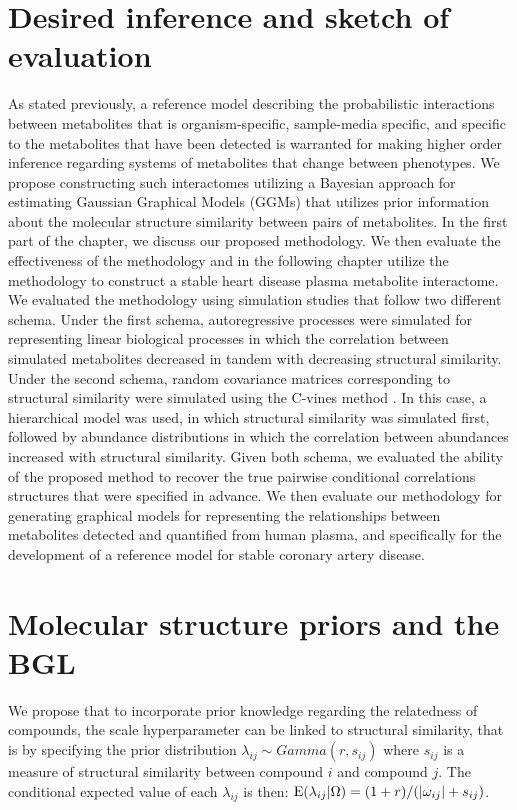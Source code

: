 \label{structureADBGL}
\begin{DoubleSpace*}
\section{Desired inference and sketch of evaluation}
As stated previously, a reference model describing the probabilistic interactions between metabolites that is organism-specific, sample-media specific, and specific to the metabolites that have been detected is warranted for making higher order inference regarding systems of metabolites that change between phenotypes. We propose constructing such interactomes utilizing a Bayesian approach for estimating Gaussian Graphical Models (GGMs) that utilizes prior information about the molecular structure similarity between pairs of metabolites. In the first part of the chapter, we discuss our proposed methodology. We then evaluate the effectiveness of the methodology and in the following chapter utilize the methodology to construct a stable heart disease plasma metabolite interactome. We evaluated the methodology using simulation studies that follow two different schema. Under the first schema, autoregressive processes were simulated for representing linear biological processes in which the correlation between simulated metabolites decreased in tandem with decreasing structural similarity. Under the second schema, random covariance matrices corresponding to structural similarity were simulated using the C-vines method \cite{lewandowski2009}. In this case, a hierarchical model was used, in which structural similarity was simulated first, followed by abundance distributions in which the correlation between abundances increased with structural similarity. Given both schema, we evaluated the ability of the proposed method to recover the true pairwise conditional correlations structures that were specified in advance. We then evaluate our methodology for generating graphical models for representing the relationships between metabolites detected and quantified from human plasma, and specifically for the development of a reference model for stable coronary artery disease. 

\section{Molecular structure priors and the BGL}
We propose that to incorporate prior knowledge regarding the relatedness of compounds, the scale hyperparameter can be linked to structural similarity, that is by specifying the prior distribution $\lambda_{ij}\sim Gamma(r,s_{ij})$ where $s_{ij}$ is a measure of structural similarity between compound $i$ and compound $j$. The conditional expected value of each $\lambda_{ij}$ is then: $\operatorname{E}(\lambda_{ij}|\Omega)=(1+r)/(|\omega_{ij} |+s_{ij})$.


\end{DoubleSpace*}
